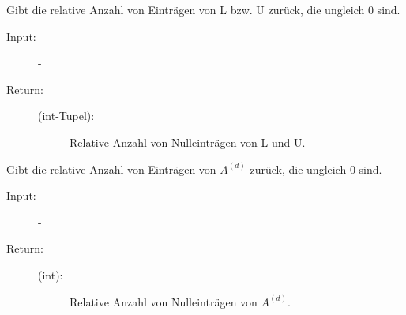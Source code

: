 \documentclass[letterpaper,10pt,ngerman, oneside, openright]{sphinxmanual}
\begin{document}
\begin{fulllineitems}
\begin{fulllineitems}
\begin{description}
\begin{description}
\end{description}

\end{description}

\end{fulllineitems}


\begin{fulllineitems}
\label{\detokenize{index:sparse_erw.Sparse.anz_nn_lu_rel}}
Gibt die relative Anzahl von Einträgen von L bzw. U zurück, die ungleich 0 sind.

\begin{description}
\item [{Input:}] -
\end{description}
\begin{description}
\item[{Return:}] \leavevmode\begin{description}
\item[{(int-Tupel):}] \leavevmode
Relative Anzahl von Nulleinträgen von L und U.

\end{description}

\end{description}

\end{fulllineitems}


\begin{fulllineitems}
\label{\detokenize{index:sparse_erw.Sparse.anz_nn_rel}}
Gibt die relative Anzahl von Einträgen von $A^{(d)}$ zurück, die ungleich 0 sind.

\begin{description}
\item [{Input:}] -
\end{description}
\begin{description}
\item[{Return:}] \leavevmode\begin{description}
\item[{(int):}] \leavevmode
Relative Anzahl von Nulleinträgen von $A^{(d)}$.

\end{description}

\end{description}


\end{fulllineitems}
\end{fulllineitems}
\end{document}
